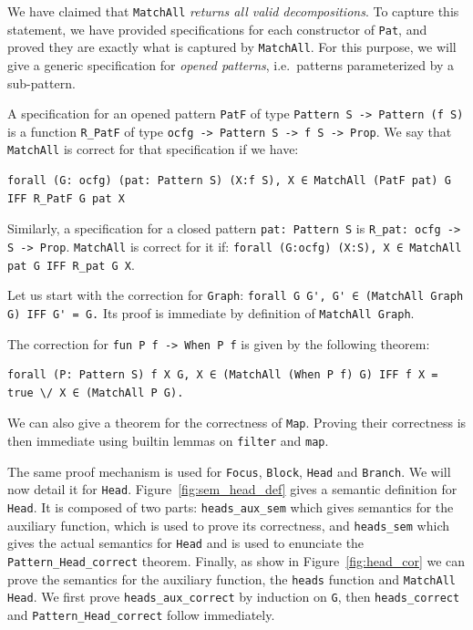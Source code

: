 \documentclass[11pt]{article}
\newcommand{\inlinecoq}[1]{\mbox{\lstinline[style=customcoq,columns=fixed,basewidth=.48em]{#1}}}
\newcommand{\ilc}[1]{\inlinecoq{#1}}
\newcommand{\pat}{\texttt{Pat}\xspace}
\begin{document}
We have claimed that \ilc{MatchAll} \emph{returns all valid decompositions}. To capture this statement, we have provided specifications for each constructor of \pat, and proved they are exactly what is captured by \ilc{MatchAll}. For this purpose, we will give a generic specification for \emph{opened patterns}, i.e.\ patterns parameterized by a sub-pattern.

A specification for an opened pattern \ilc{PatF} of type \ilc{Pattern S -> Pattern (f S)} is a function \ilc{R_PatF} of type \ilc{ocfg -> Pattern S -> f S -> Prop}. We say that \ilc{MatchAll} is correct for that specification if we have:
\begin{lstlisting}[style=customcoq,basicstyle=\small\ttfamily]
forall (G: ocfg) (pat: Pattern S) (X:f S), X ∈ MatchAll (PatF pat) G IFF R_PatF G pat X
\end{lstlisting}

Similarly, a specification for a closed pattern \ilc{pat: Pattern S} is \ilc{R_pat: ocfg -> S -> Prop}. \ilc{MatchAll} is correct for it if: \ilc{forall (G:ocfg) (X:S), X ∈ MatchAll pat G IFF R_pat G X}. 

Let us start with the correction for \ilc{Graph}: \ilc{forall G G', G' ∈ (MatchAll Graph G) IFF G' = G.} Its proof is immediate by definition of \ilc{MatchAll Graph}.

The correction for \ilc{fun P f -> When P f} is given by the following theorem:
\begin{lstlisting}[style=customcoq,basicstyle=\small\ttfamily]
  forall (P: Pattern S) f X G, X ∈ (MatchAll (When P f) G) IFF f X = true \/ X ∈ (MatchAll P G).
\end{lstlisting}
We can also give a theorem for the correctness of \ilc{Map}. Proving their correctness is then immediate using builtin lemmas on \ilc{filter} and \ilc{map}.

The same proof mechanism is used for \ilc{Focus}, \ilc{Block}, \ilc{Head} and \ilc{Branch}. We will now detail it for \ilc{Head}.
%
%
Figure~\ref{fig:sem_head_def} gives a semantic definition for \ilc{Head}. It is composed of two parts: \ilc{heads_aux_sem} which gives semantics for the auxiliary function, which is used to prove its correctness, and \ilc{heads_sem} which gives the actual semantics for \ilc{Head} and is used to enunciate the \ilc{Pattern_Head_correct} theorem.
%
Finally, as show in Figure~\ref{fig:head_cor} we can prove the semantics for the auxiliary function, the \ilc{heads} function and \ilc{MatchAll Head}. We first prove \ilc{heads_aux_correct} by induction on \ilc{G}, then \ilc{heads_correct} and \ilc{Pattern_Head_correct} follow immediately.
\end{document}
